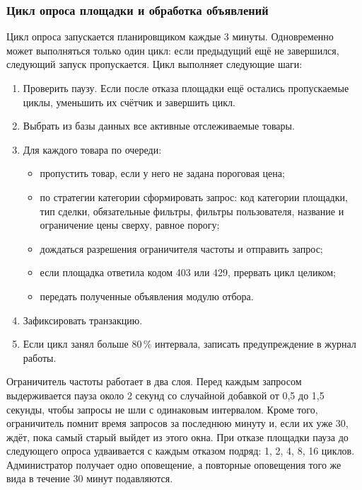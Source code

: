 \subsubsection{Цикл опроса площадки и обработка объявлений}

Цикл опроса запускается планировщиком каждые 3 минуты. Одновременно может выполняться только один цикл: если предыдущий ещё не завершился, следующий запуск пропускается. Цикл выполняет следующие шаги:
\begin{enumerate}
	\item Проверить паузу. Если после отказа площадки ещё остались пропускаемые циклы, уменьшить их счётчик и завершить цикл.
	\item Выбрать из базы данных все активные отслеживаемые товары.
	\item Для каждого товара по очереди:
	\begin{itemize}[itemindent=2.2ex,leftmargin=2\parindent,label=--]
		\item пропустить товар, если у него не задана пороговая цена;
		\item по стратегии категории сформировать запрос: код категории площадки, тип сделки, обязательные фильтры, фильтры пользователя, название и ограничение цены сверху, равное порогу;
		\item дождаться разрешения ограничителя частоты и отправить запрос;
		\item если площадка ответила кодом 403 или 429, прервать цикл целиком;
		\item передать полученные объявления модулю отбора.
	\end{itemize}
	\item Зафиксировать транзакцию.
	\item Если цикл занял больше 80\,\% интервала, записать предупреждение в журнал работы.
\end{enumerate}

Ограничитель частоты работает в два слоя. Перед каждым запросом выдерживается пауза около 2 секунд со случайной добавкой от 0,5 до 1,5 секунды, чтобы запросы не шли с одинаковым интервалом. Кроме того, ограничитель помнит время запросов за последнюю минуту и, если их уже 30, ждёт, пока самый старый выйдет из этого окна. При отказе площадки пауза до следующего опроса удваивается с каждым отказом подряд: 1, 2, 4, 8, 16 циклов. Администратор получает одно оповещение, а повторные оповещения того же вида в течение 30 минут подавляются.

